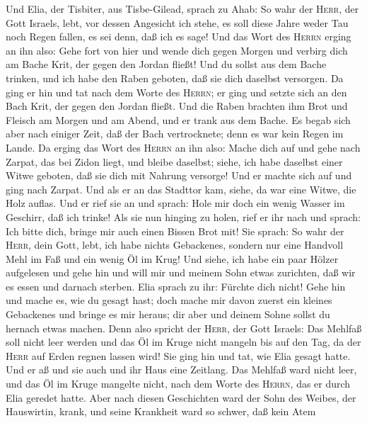  Und Elia, der Tisbiter, aus Tisbe-Gilead, sprach zu Ahab:
So wahr der \textsc{Herr}, der Gott Israels, lebt, vor dessen Angesicht
ich stehe, es soll diese Jahre weder Tau noch Regen fallen, es sei denn,
daß ich es sage!  Und das Wort des \textsc{Herrn} erging
an ihn also:  Gehe fort von hier und wende dich gegen
Morgen und verbirg dich am Bache Krit, der gegen den Jordan fließt!
 Und du sollst aus dem Bache trinken, und ich habe den
Raben geboten, daß sie dich daselbst versorgen.  Da ging
er hin und tat nach dem Worte des \textsc{Herrn}; er ging und setzte
sich an den Bach Krit, der gegen den Jordan fließt.  Und
die Raben brachten ihm Brot und Fleisch am Morgen und am Abend, und er
trank aus dem Bache.  Es begab sich aber nach einiger
Zeit, daß der Bach vertrocknete; denn es war kein Regen im Lande.
 Da erging das Wort des \textsc{Herrn} an ihn also:
 Mache dich auf und gehe nach Zarpat, das bei Zidon liegt,
und bleibe daselbst; siehe, ich habe daselbst einer Witwe geboten, daß
sie dich mit Nahrung versorge!  Und er machte sich auf
und ging nach Zarpat. Und als er an das Stadttor kam, siehe, da war eine
Witwe, die Holz auflas. Und er rief sie an und sprach: Hole mir doch ein
wenig Wasser im Geschirr, daß ich trinke!  Als sie nun
hinging zu holen, rief er ihr nach und sprach: Ich bitte dich, bringe
mir auch einen Bissen Brot mit!  Sie sprach: So wahr der
\textsc{Herr}, dein Gott, lebt, ich habe nichts Gebackenes, sondern nur
eine Handvoll Mehl im Faß und ein wenig Öl im Krug! Und siehe, ich habe
ein paar Hölzer aufgelesen und gehe hin und will mir und meinem Sohn
etwas zurichten, daß wir es essen und darnach sterben. 
Elia sprach zu ihr: Fürchte dich nicht! Gehe hin und mache es, wie du
gesagt hast; doch mache mir davon zuerst ein kleines Gebackenes und
bringe es mir heraus; dir aber und deinem Sohne sollst du hernach etwas
machen.  Denn also spricht der \textsc{Herr}, der Gott
Israels: Das Mehlfaß soll nicht leer werden und das Öl im Kruge nicht
mangeln bis auf den Tag, da der \textsc{Herr} auf Erden regnen lassen
wird!  Sie ging hin und tat, wie Elia gesagt hatte. Und
er aß und sie auch und ihr Haus eine Zeitlang.  Das
Mehlfaß ward nicht leer, und das Öl im Kruge mangelte nicht, nach dem
Worte des \textsc{Herrn}, das er durch Elia geredet hatte.
 Aber nach diesen Geschichten ward der Sohn des Weibes,
der Hauswirtin, krank, und seine Krankheit ward so schwer, daß kein Atem
